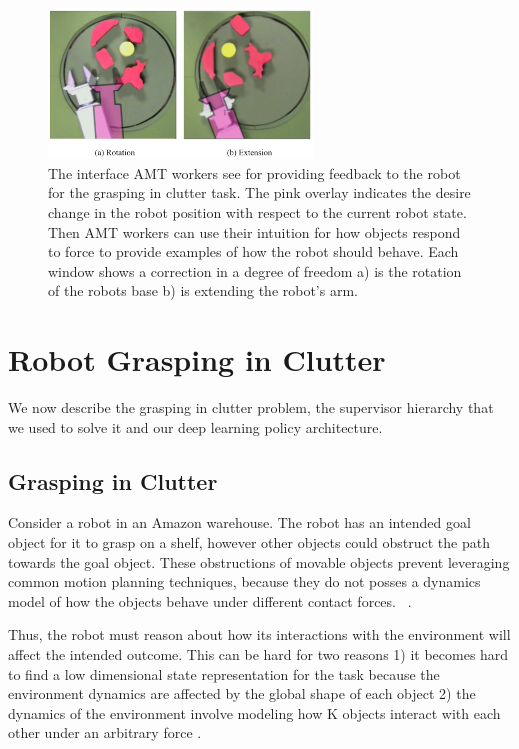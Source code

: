 \documentclass[10pt, conference]{ieeeconf}      %
\begin{document}
 
\begin{figure}[t]
\centering

\includegraphics[width=\columnwidth, height=4cm]{f_figs/labeling.pdf}

\caption{\footnotesize  The interface AMT workers see for providing feedback to the robot for the grasping in clutter task. The pink overlay indicates the desire change in the robot position with respect to the current robot state. Then AMT workers can use their intuition for how objects respond to force to provide examples of how the robot should behave. Each window shows a correction in a degree of freedom a) is the rotation of the robots base b) is extending the robot's arm.}
\vspace*{-10pt}
\label{fig:overlays}
\end{figure}


\section{Robot Grasping in Clutter}
We now describe the grasping in clutter problem, the supervisor hierarchy that we used to solve it and our deep learning policy architecture. 

\subsection{Grasping in Clutter}\label{sec:task}
Consider a robot in an Amazon warehouse. The robot has an intended goal object for it to grasp on a shelf, however other objects could obstruct the path towards the goal object. These obstructions of movable objects prevent leveraging common motion planning techniques, because they do not posses a dynamics model of how the objects behave under different contact forces. ~\cite{kitaevphysics,kingnonprehensile}.

Thus, the robot must reason about how its interactions with the environment will affect the intended outcome. This can be hard for two reasons 1) it becomes hard to find a low dimensional state representation for the task because the environment dynamics are affected by the global shape of each object 2) the dynamics of the environment  involve modeling how K objects interact with each other under an arbitrary force \cite{kitaevphysics}.
\end{document}
